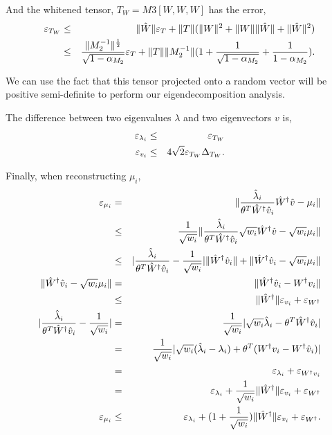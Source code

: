 And the whitened tensor, $T_W = M3[W,W,W]$ has the error, 
\begin{eqnarray}
  \varepsilon_{T_W} 
    &\le& \|\hat{W}\| \varepsilon_{T} + \|T\| (\|W\|^2 + \|W\|\|\hat{W}\| + \|\hat{W}\|^2 ) \\
    &\le& \frac{\|M_2^{-1}\|^{\frac{1}{2}}}{\sqrt{1 - \alpha_{M_2}}} \varepsilon_{T} + \|T\| \|M_2^{-1}\| (1 + \frac{1}{\sqrt{1 - \alpha_{M_2}}} + \frac{1}{1 - \alpha_{M_2}}).
\end{eqnarray}

We can use the fact that this tensor projected onto a random vector will
be positive semi-definite to perform our eigendecomposition analysis.

The difference between two eigenvalues $\lambda$ and two eigenvectors
$v$ is, 
\begin{align}
  \varepsilon_{\lambda_i} &\le& \varepsilon_{T_W} \\
  \varepsilon_{v_i} &\le& 4\sqrt{2} \varepsilon_{T_W} \Delta_{T_W}.
\end{align}

Finally, when reconstructing $\mu_i$, 
\begin{align}
  \varepsilon_{\mu_i} &=& \| \frac{\hat{\lambda}_i}{\theta^T \hat{W}^{\dagger} \hat{v}_i} \hat{W}^{\dagger} \hat{v} - \mu_i \| \\
  &\le& \frac{1}{\sqrt{w_i}} \| \frac{\hat{\lambda}_i}{\theta^T \hat{W}^{\dagger} \hat{v}_i} \sqrt{w_i} \hat{W}^{\dagger} \hat{v} - \sqrt{w_i} \mu_i \| \\
  &\le& | \frac{\hat{\lambda}_i}{\theta^T \hat{W}^{\dagger} \hat{v}_i} - \frac{1}{\sqrt{w_i}} | \|\hat{W}^{\dagger} \hat{v}_i\| + \| \hat{W}^{\dagger} \hat{v}_i - \sqrt{w_i} \mu_i \| \\
  \| \hat{W}^{\dagger} \hat{v}_i - \sqrt{w_i} \mu_i \| 
  &=&  \| \hat{W}^{\dagger} \hat{v}_i - W^{\dagger} v_i \| \\
  &\le&  \| \hat{W}^{\dagger} \| \varepsilon_{v_i} + \varepsilon_{W^{\dagger}} \\
  | \frac{\hat{\lambda}_i}{\theta^T \hat{W}^{\dagger} \hat{v}_i} - \frac{1}{\sqrt{w_i}} | 
  &=& \frac{1}{\sqrt{w_i}} |\sqrt{w_i} \hat{\lambda}_i - \theta^T \hat{W}^{\dagger} \hat{v}_i | \\
  &=& \frac{1}{\sqrt{w_i}} |\sqrt{w_i} (\hat{\lambda}_i - \lambda_i) + \theta^T ( W^{\dagger}v_i -  W^{\dagger}\hat{v}_i) | \\
  &=& \varepsilon_{\lambda_i} + \varepsilon_{W^{\dagger}v_i} \\
  &=& \varepsilon_{\lambda_i} + \frac{1}{\sqrt{w_i}} \| \hat{W}^{\dagger} \| \varepsilon_{v_i} + \varepsilon_{W^{\dagger}} \\
  \varepsilon_{\mu_i} 
  &\le& \varepsilon_{\lambda_i} + (1+\frac{1}{\sqrt{w_i}}) \| \hat{W}^{\dagger} \| \varepsilon_{v_i} + \varepsilon_{W^{\dagger}}.
\end{align}


